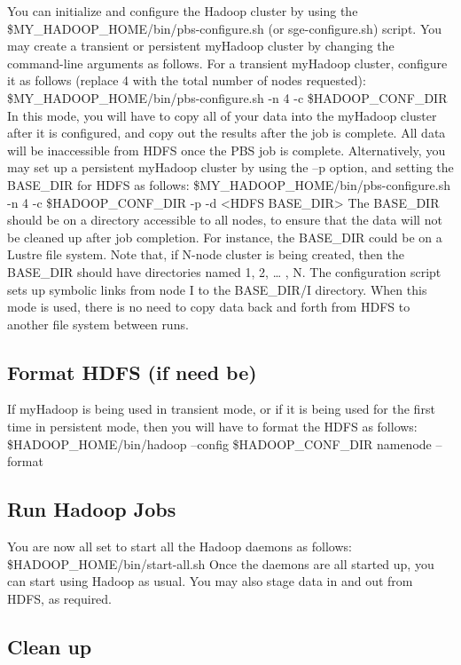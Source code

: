 \documentclass{article}
\begin{document}
You can initialize and configure the Hadoop cluster by using the
\$MY\_HADOOP\_HOME/bin/pbs-configure.sh (or sge-configure.sh) script. You may
create a transient or persistent myHadoop cluster by changing the command-line
arguments as follows.
For a transient myHadoop cluster, configure it as follows (replace 4 with the total number
of nodes requested):
\$MY\_HADOOP\_HOME/bin/pbs-configure.sh -n 4 -c \$HADOOP\_CONF\_DIR
In this mode, you will have to copy all of your data into the myHadoop cluster after it is
configured, and copy out the results after the job is complete. All data will be
inaccessible from HDFS once the PBS job is complete.
Alternatively, you may set up a persistent myHadoop cluster by using the –p option, and
setting the BASE\_DIR for HDFS as follows:
\$MY\_HADOOP\_HOME/bin/pbs-configure.sh -n 4 -c \$HADOOP\_CONF\_DIR -p -d
<HDFS BASE\_DIR>
The BASE\_DIR should be on a directory accessible to all nodes, to ensure that the data
will not be cleaned up after job completion. For instance, the BASE\_DIR could be on a
Lustre file system. Note that, if N-node cluster is being created, then the BASE\_DIR
should have directories named 1, 2, … , N. The configuration script sets up symbolic
links from node I to the BASE\_DIR/I directory. When this mode is used, there is no need
to copy data back and forth from HDFS to another file system between runs.

\subsection{Format HDFS (if need be)}

If myHadoop is being used in transient mode, or if it is being used for the first time in
persistent mode, then you will have to format the HDFS as follows:
\$HADOOP\_HOME/bin/hadoop --config \$HADOOP\_CONF\_DIR namenode –format

\subsection{Run Hadoop Jobs}

You are now all set to start all the Hadoop daemons as follows:
\$HADOOP\_HOME/bin/start-all.sh
Once the daemons are all started up, you can start using Hadoop as usual. You may also
stage data in and out from HDFS, as required.

\subsection{Clean up}
\end{document}
